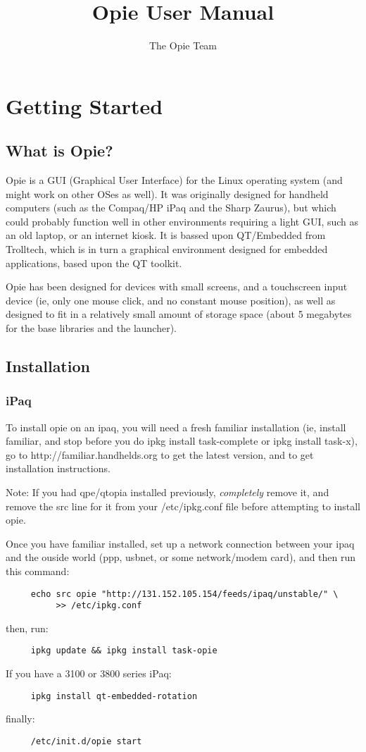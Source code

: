 \documentclass[12pt,letterpaper,oneside, openany]{book} \usepackage[latin1] {inputenc}
\title{Opie User Manual}
\author{The Opie Team}
\begin{document}
\maketitle
\tableofcontents
\part{Getting Started}
\chapter{What is Opie?}
Opie is a GUI (Graphical User Interface) for the Linux operating system (and might work on other OSes as well).  It was originally designed for handheld computers (such as the Compaq/HP iPaq and the Sharp Zaurus), but which could probably function well in other environments requiring a light GUI, such as an old laptop, or an internet kiosk.  It is bassed upon QT/Embedded from Trolltech, which is in turn a graphical environment designed for embedded applications, based upon the QT toolkit.

Opie has been designed for devices with small screens, and a touchscreen input device (ie, only one mouse click, and no constant mouse position), as well as designed to fit in a relatively small amount of storage space (about 5 megabytes for the base libraries and the launcher).
\chapter{Installation}
\section{iPaq}
To install opie on an ipaq, you will need a fresh familiar installation (ie, install familiar, and stop before you do ipkg install task-complete or ipkg install task-x), go to http://familiar.handhelds.org to get the latest version, and to get installation instructions.

Note: If you had qpe/qtopia installed previously, \emph{completely} remove it, and remove the src line for it from your /etc/ipkg.conf file before attempting to install opie.

Once you have familiar installed, set up a network connection between your ipaq and the ouside world (ppp, usbnet, or some network/modem card), and then run this command:
\begin{verbatim}
     echo src opie "http://131.152.105.154/feeds/ipaq/unstable/" \
          >> /etc/ipkg.conf
\end{verbatim} 
then, run:
\begin{verbatim}
     ipkg update && ipkg install task-opie
\end{verbatim}
If you have a 3100 or 3800 series iPaq:
\begin{verbatim}
     ipkg install qt-embedded-rotation
\end{verbatim}
finally:
\begin{verbatim}
     /etc/init.d/opie start
\end{verbatim}
\end{document}
